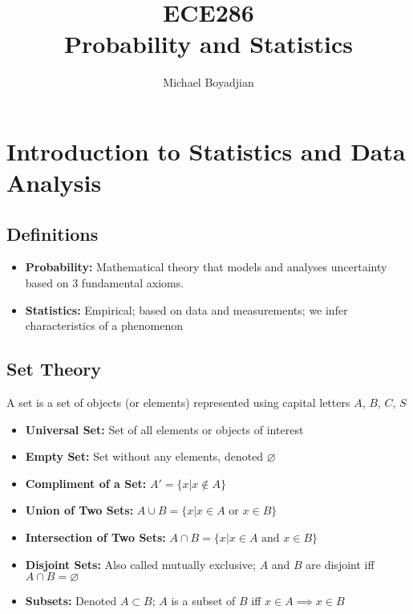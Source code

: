 \documentclass[11pt]{article}
\begin{document}
\title{ECE286 \\ Probability and Statistics}
\author{Michael Boyadjian}
\maketitle
\pagebreak

\tableofcontents

\pagebreak

\bigskip
\bigskip
\bigskip


\section{Introduction to Statistics and Data Analysis}

\subsection{Definitions}
\begin{itemize}
\item \textbf{Probability:} Mathematical theory that models and analyses uncertainty based on 3 fundamental axioms. 
\item \textbf{Statistics:} Empirical; based on data and measurements; we infer characteristics of a phenomenon
\end{itemize}

\subsection{Set Theory}
A set is a set of objects (or elements) represented using capital letters $A$, $B$, $C$, $S$
\begin{itemize}
\item \textbf{Universal Set:} Set of all elements or objects of interest
\item \textbf{Empty Set:} Set without any elements, denoted $\varnothing$
\item \textbf{Compliment of a Set:} $A' = \{x | x \notin A\} $
\item \textbf{Union of Two Sets:} $ A \cup B = \{x | x \in A \text{ or } x \in B\}$
\item \textbf{Intersection of Two Sets:} $ A \cap B = \{x | x \in A \text{ and } x \in B\}$
\item \textbf{Disjoint Sets:}  Also called mutually exclusive; $A$ and $B$ are disjoint iff  $A \cap B = \varnothing$
\item \textbf{Subsets:} Denoted $A \subset B$; $A$ is a subset of $B$ iff $x \in A \implies x \in B$
\end{itemize}
\end{document}

